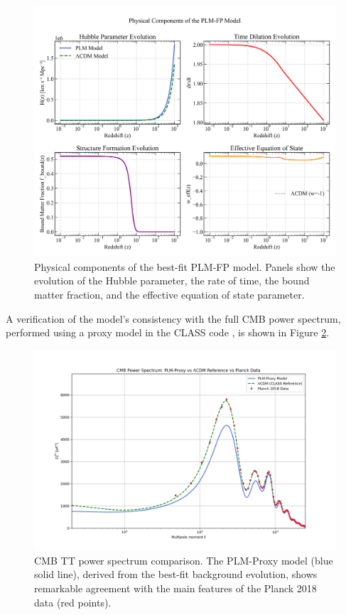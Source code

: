 \documentclass[12pt, a4paper]{article}
\begin{document}
\begin{figure}[H]
    \centering
    \includegraphics[width=\textwidth]{figure1_model_physics.png}
    \caption{Physical components of the best-fit PLM-FP model. Panels show the evolution of the Hubble parameter, the rate of time, the bound matter fraction, and the effective equation of state parameter.}
    \label{fig:model_physics}
\end{figure}

A verification of the model's consistency with the full CMB power spectrum, performed using a proxy model in the CLASS code \cite{CLASS}, is shown in Figure \ref{fig:cmb_spectrum}.

\begin{figure}[H]
    \centering
    \includegraphics[width=\textwidth]{cmb_spectrum_final_comparison.png}
    \caption{CMB TT power spectrum comparison. The PLM-Proxy model (blue solid line), derived from the best-fit background evolution, shows remarkable agreement with the main features of the Planck 2018 data (red points).}
    \label{fig:cmb_spectrum}
\end{figure}
\end{document}
